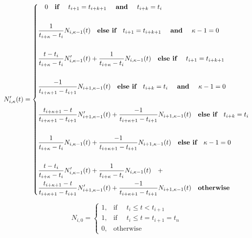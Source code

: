 \documentclass{article}
\begin{document}
 \begin{equation} \label{eq:Basis function equation}
  N_{i,\kappa}'(t) = \begin{dcases}  \quad 0 \quad  \textbf{if } \quad t_{i+1} = t_{i+k+1} \quad  \textbf{ and } \quad t_{i+k} = t_{i} \\  \\
 \frac{1}{t_{i+\kappa} - t_i} N_{i,\kappa-1}(t) \quad  \textbf{else if} \quad t_{i+1} = t_{i+k+1}  \quad  \textbf{ and }  \quad \kappa-1 = 0 \\ \\ 
  \frac{t - t_i}{t_{i+\kappa} - t_i} N_{i,\kappa-1}'(t) + \frac{1}{t_{i+\kappa} - t_i} N_{i,\kappa-1}(t) \quad  \textbf{else if } \quad t_{i+1} = t_{i+k+1}\\ \\ 
  \frac{-1}{t_{i+\kappa+1}-t_{i+1}} N_{i+1 , \kappa-1}(t) \quad \textbf{else if} \quad t_{i+k} = t_{i} \quad  \textbf{ and }  \quad \kappa-1 = 0 \\ \\
  \frac{t_{i+\kappa+1} - t}{t_{i+\kappa+1}-t_{i+1}} N_{i+1 , \kappa-1}'(t) +  \frac{-1}{t_{i+\kappa+1}-t_{i+1}} N_{i+1 , \kappa-1}(t) \quad \textbf{else if} \quad t_{i+k} = t_{i} \\ \\
  \frac{1}{t_{i+\kappa} - t_i} N_{i,\kappa-1}(t) +  \frac{-1}{t_{i+\kappa+1}-t_{i+1}} N_{i+1 , \kappa-1}(t) \quad \textbf{else if}  \quad \kappa-1 = 0 \\ \\
  \frac{t - t_i}{t_{i+\kappa} - t_i} N_{i,\kappa-1}'(t) + \frac{1}{t_{i+\kappa} - t_i} N_{i,\kappa-1}(t) \quad + \\
  \frac{t_{i+\kappa+1} - t}{t_{i+\kappa+1}-t_{i+1}} N_{i+1 , \kappa-1}'(t) +  \frac{-1}{t_{i+\kappa+1}-t_{i+1}} N_{i+1 , \kappa-1}(t) \quad \textbf{otherwise}
  \end{dcases}
  \end{equation}
  
 \hspace{1cm}
 
 \begin{equation} \label{eq:Basis function equation zeros}
      N_{i,0} =   \begin{cases} 1, &  \text{if } \quad t_i \leq t < t_{i+1} \\
                            1, & \text{if } \quad t_i \leq t = t_{i+1} = t_n \\
                            0, & \text{otherwise} \end{cases}
  \end{equation}
  
\end{document}
